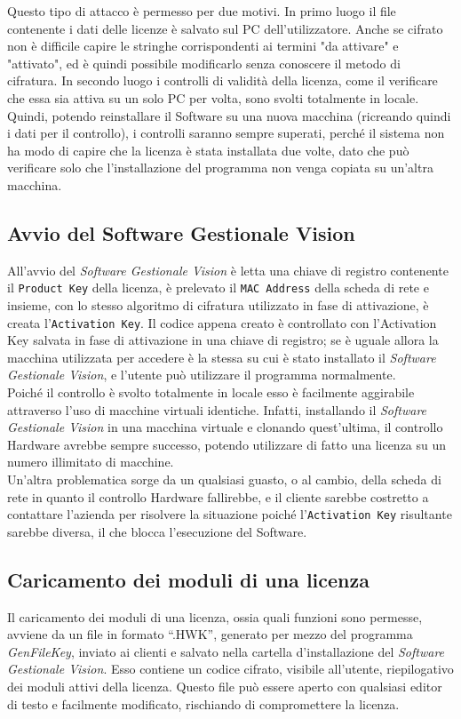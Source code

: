 Questo tipo di attacco è permesso per due motivi. In primo luogo il file contenente i dati delle licenze è salvato sul PC dell'utilizzatore. Anche se cifrato non è difficile capire le stringhe corrispondenti ai termini "da attivare" e "attivato", ed è quindi possibile modificarlo senza conoscere il metodo di cifratura. In secondo luogo i controlli di validità della licenza, come il verificare che essa sia attiva su un solo PC per volta, sono svolti totalmente in locale. Quindi, potendo reinstallare il Software su una nuova macchina (ricreando quindi i dati per il controllo), i controlli saranno sempre superati, perché il sistema non ha modo di capire che la licenza è stata installata due volte, dato che può verificare solo che l'installazione del programma non venga copiata su un'altra macchina. 

\subsection{Avvio del Software Gestionale Vision} 

All'avvio del \textit{Software Gestionale Vision} è letta una chiave di registro contenente il \texttt{Product Key} della licenza, è prelevato il \texttt{MAC Address} della scheda di rete e insieme, con lo stesso algoritmo di cifratura utilizzato in fase di attivazione, è creata l'\texttt{Activation Key}. Il codice appena creato è controllato con l’Activation Key salvata in fase di attivazione in una chiave di registro; se è uguale allora la macchina utilizzata per accedere è la stessa su cui è stato installato il \textit{Software Gestionale Vision}, e l’utente può utilizzare il programma normalmente.\\
Poiché il controllo è svolto totalmente in locale esso è facilmente aggirabile attraverso l’uso di macchine virtuali identiche. Infatti, installando il \textit{Software Gestionale Vision} in una macchina virtuale e clonando quest'ultima, il controllo Hardware avrebbe sempre successo, potendo utilizzare di fatto una licenza su un numero illimitato di macchine. 
\\Un'altra problematica sorge da un qualsiasi guasto, o al cambio, della scheda di rete in quanto il controllo Hardware fallirebbe, e il cliente sarebbe costretto a contattare l’azienda per risolvere la situazione poiché l'\texttt{Activation Key} risultante sarebbe diversa, il che blocca l'esecuzione del Software.

\subsection{Caricamento dei moduli di una licenza} 
Il caricamento dei moduli di una licenza, ossia quali funzioni sono permesse, avviene da un file in formato “.HWK”, generato per mezzo del 
programma \textit{GenFileKey}, inviato ai clienti e salvato nella cartella d'installazione del \textit{Software Gestionale Vision}. Esso contiene un codice cifrato, visibile all’utente, riepilogativo dei moduli attivi della licenza. Questo file può essere aperto con qualsiasi editor di testo e facilmente modificato, rischiando di compromettere la licenza.

